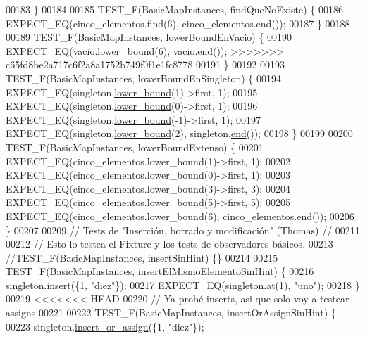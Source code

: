 \begin{DoxyCode}
00183 \}
00184 
00185 TEST\_F(BasicMapInstances, findQueNoExiste) \{
00186     EXPECT\_EQ(cinco\_elementos.find(6), cinco\_elementos.end());
00187 \}
00188 
00189 TEST\_F(BasicMapInstances, lowerBoundEnVacio) \{
00190     EXPECT\_EQ(vacio.lower\_bound(6), vacio.end());
>>>>>>> c65fd8be2a717c6f2a8a1752b749f0f1e1fc8778
00191 \}
00192 
00193 TEST\_F(BasicMapInstances, lowerBoundEnSingleton) \{
00194     EXPECT\_EQ(singleton.\hyperlink{classaed2_1_1map_a62075a47afdf89267c5462f88164af3d_a62075a47afdf89267c5462f88164af3d}{lower\_bound}(1)->first, 1);
00195     EXPECT\_EQ(singleton.\hyperlink{classaed2_1_1map_a62075a47afdf89267c5462f88164af3d_a62075a47afdf89267c5462f88164af3d}{lower\_bound}(0)->first, 1);
00196     EXPECT\_EQ(singleton.\hyperlink{classaed2_1_1map_a62075a47afdf89267c5462f88164af3d_a62075a47afdf89267c5462f88164af3d}{lower\_bound}(-1)->first, 1);
00197     EXPECT\_EQ(singleton.\hyperlink{classaed2_1_1map_a62075a47afdf89267c5462f88164af3d_a62075a47afdf89267c5462f88164af3d}{lower\_bound}(2), singleton.\hyperlink{classaed2_1_1map_a76023e6a56cb625513e1b5ea028bf983_a76023e6a56cb625513e1b5ea028bf983}{end}());
00198 \}
00199 
00200 TEST\_F(BasicMapInstances, lowerBoundExtenso) \{
00201     EXPECT\_EQ(cinco\_elementos.lower\_bound(1)->first, 1);
00202     EXPECT\_EQ(cinco\_elementos.lower\_bound(0)->first, 1);
00203     EXPECT\_EQ(cinco\_elementos.lower\_bound(3)->first, 3);
00204     EXPECT\_EQ(cinco\_elementos.lower\_bound(5)->first, 5);
00205     EXPECT\_EQ(cinco\_elementos.lower\_bound(6), cinco\_elementos.end());
00206 \}
00207 
00209 \textcolor{comment}{// Tests de "Inserción, borrado y modificación" (Thomas) //}
00211 \textcolor{comment}{}
00212 \textcolor{comment}{// Esto lo testea el Fixture y los tests de observadores básicos.}
00213 \textcolor{comment}{//TEST\_F(BasicMapInstances, insertSinHint) \{\}}
00214 
00215 TEST\_F(BasicMapInstances, insertElMismoElementoSinHint) \{
00216     singleton.\hyperlink{classaed2_1_1map_a60aacba06b1579630b3c8e996cf248c8_a60aacba06b1579630b3c8e996cf248c8}{insert}(\{1, \textcolor{stringliteral}{"diez"}\});
00217     EXPECT\_EQ(singleton.\hyperlink{classaed2_1_1map_a579c9179b42175c23a1013ac7f1b876c_a579c9179b42175c23a1013ac7f1b876c}{at}(1), \textcolor{stringliteral}{"uno"});
00218 \}
00219 
<<<<<<< HEAD
00220 \textcolor{comment}{// Ya probé inserts, asi que solo voy a testear assigns}
00221 
00222 TEST\_F(BasicMapInstances, insertOrAssignSinHint) \{
00223     singleton.\hyperlink{classaed2_1_1map_a2ef6723c183916276b0afc4a4c721475_a2ef6723c183916276b0afc4a4c721475}{insert_or_assign}(\{1, \textcolor{stringliteral}{"diez"}\});

\end{DoxyCode}
